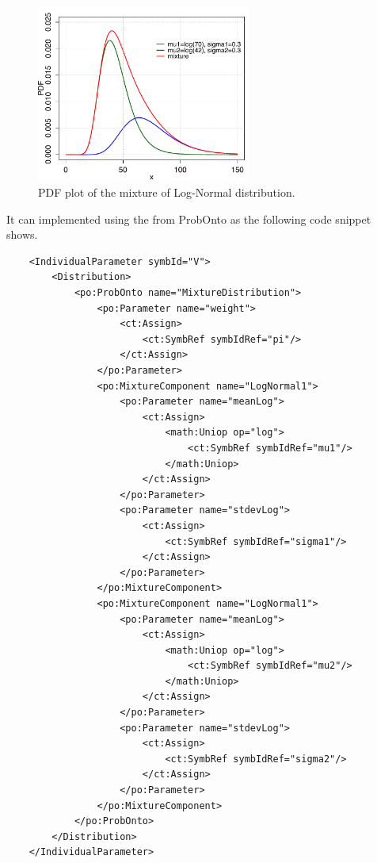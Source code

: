 \begin{figure}[htb!]
\centering
  \includegraphics[width=70mm]{pics/MixtureLogNormal1.pdf}
 \caption[PDF of the Mixture of Log-Normal distribution]{PDF plot of the mixture of Log-Normal distribution.}
 \label{fig:MixtureLogNormal}
\end{figure}

It can implemented using the  from ProbOnto
as the following code snippet shows. 

\lstset{language=XML}
\begin{lstlisting}
    <IndividualParameter symbId="V">
        <Distribution>
            <po:ProbOnto name="MixtureDistribution">
                <po:Parameter name="weight">
                    <ct:Assign>
                        <ct:SymbRef symbIdRef="pi"/>
                    </ct:Assign>
                </po:Parameter>
                <po:MixtureComponent name="LogNormal1">
                    <po:Parameter name="meanLog">
                        <ct:Assign>
                            <math:Uniop op="log">
                                <ct:SymbRef symbIdRef="mu1"/>
                            </math:Uniop>
                        </ct:Assign>
                    </po:Parameter>
                    <po:Parameter name="stdevLog">
                        <ct:Assign>
                            <ct:SymbRef symbIdRef="sigma1"/>
                        </ct:Assign>
                    </po:Parameter>
                </po:MixtureComponent>
                <po:MixtureComponent name="LogNormal1">
                    <po:Parameter name="meanLog">
                        <ct:Assign>
                            <math:Uniop op="log">
                                <ct:SymbRef symbIdRef="mu2"/>
                            </math:Uniop>
                        </ct:Assign>
                    </po:Parameter>
                    <po:Parameter name="stdevLog">
                        <ct:Assign>
                            <ct:SymbRef symbIdRef="sigma2"/>
                        </ct:Assign>
                    </po:Parameter>
                </po:MixtureComponent>
            </po:ProbOnto>
        </Distribution>
    </IndividualParameter>
\end{lstlisting}


